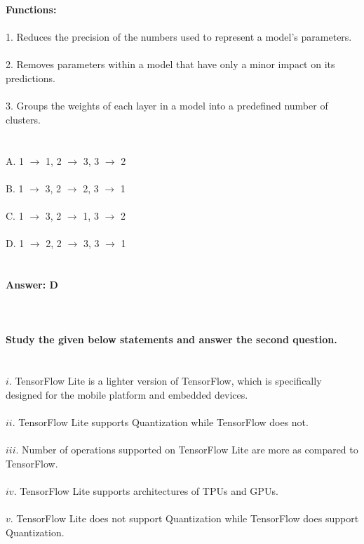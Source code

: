 \documentclass[prl,twocolumn,showpacs,preprintnumbers,superscriptaddress]{revtex4}
\theoremstyle{plain}
\theoremstyle{definition}
\begin{document}
\begin{widetext}
\noindent \textbf{Functions:}
\\
\\
1. Reduces the precision of the numbers used to represent a model's parameters.
\\
\\
2. Removes parameters within a model that have only a minor impact on its predictions.
\\
\\
3. Groups the weights of each layer in a model into a predefined number of clusters.
\\
\\
\\
\noindent A. 1 $\rightarrow$ 1, 2 $\rightarrow$ 3, 3 $\rightarrow$ 2
\\
\\
B. 1 $\rightarrow$ 3, 2 $\rightarrow$ 2, 3 $\rightarrow$ 1
\\
\\
C. 1 $\rightarrow$ 3, 2 $\rightarrow$ 1, 3 $\rightarrow$ 2
\\
\\
D. 1 $\rightarrow$ 2, 2 $\rightarrow$ 3, 3 $\rightarrow$ 1
\\
\\
\\
\textbf{Answer: D}
\\
\\
\\
\\
\textbf{Study the given below statements and answer the second question.}
\\
\\
\\
$i$. TensorFlow Lite is a lighter version of TensorFlow, which is specifically designed for the mobile platform and embedded devices.
\\
\\
$ii$. TensorFlow Lite supports Quantization while TensorFlow does not.
\\
\\
$iii$. Number of operations supported on TensorFlow Lite are more as compared to TensorFlow.
\\
\\
$iv$. TensorFlow Lite supports architectures of TPUs and GPUs.
\\
\\
$v.$ TensorFlow Lite does not support Quantization while TensorFlow does support Quantization.
\\
\\
\\

\end{widetext}
\end{document}
